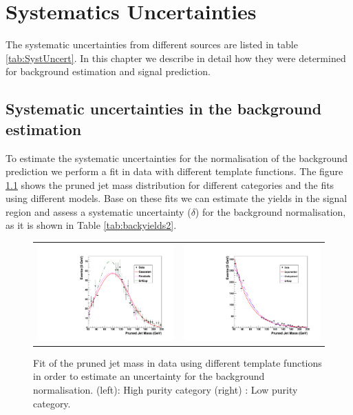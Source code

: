 \chapter{Systematics Uncertainties}\label{sys_uncert}

The systematic uncertainties from different sources are listed in table \ref{tab:SystUncert}.  In this chapter we describe in detail how they were determined for background estimation and signal prediction.

\section{Systematic uncertainties in the background estimation}\label{sys_uncert_bkg}

To estimate the systematic uncertainties for the normalisation of the background prediction we perform a fit in data with different template functions. The figure \ref{fig:fitprunedData} shows the pruned jet mass distribution for different categories and the fits using different models. Base on these fits we can estimate the yields in the signal region and assess a systematic uncertainty ($\delta$) for the background normalisation, as it is shown in Table \ref{tab:backyields2}.  

\begin{figure}[!ht]
\caption{ Fit of the pruned jet mass in data using different template functions in order to estimate an uncertainty for the background normalisation. (left): High purity category (right) : Low purity category.}
\begin{tabular}{cc}
  \includegraphics[width=200pt]{figures/systUnc/UncNormalHP.pdf} &
  \includegraphics[width=200pt]{figures/systUnc/UncNormalLP.pdf}\\
\end{tabular}
\label{fig:fitprunedData}
\end{figure}

